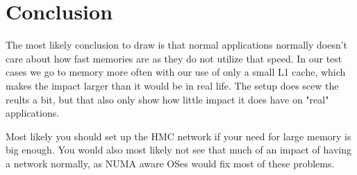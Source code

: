 \chapter{Conclusion}
The most likely conclusion to draw is that normal applications normally doesn't care about how fast memories are as they do not utilize that speed. In our test cases we go to memory more often with our use of only a small L1 cache, which makes the impact larger than it would be in real life. The setup does scew the reults a bit, but that also only show how little impact it does have on "real" applications. 

Most likely you should set up the HMC network if your need for large memory is big enough. You would also most likely not see that much of an impact of having a network normally, as NUMA aware OSes would fix most of these problems. 